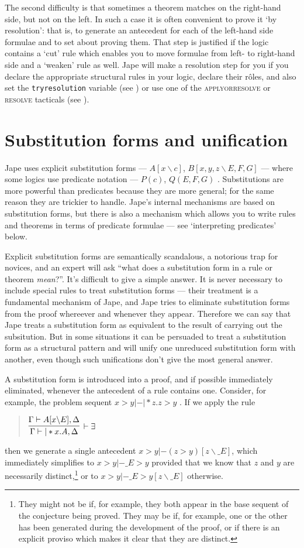 The second difficulty is that sometimes a theorem matches on the right-hand side, but not on the left. In such a case it is often convenient to prove it `by resolution': that is, to generate an antecedent for each of the left-hand side formulae and to set about proving them. That step is justified if the logic contains a `cut' rule which enables you to move formulae from left- to right-hand side and a `weaken' rule as well. Jape will make a resolution step for you if you declare the appropriate structural rules in your logic, declare their r\^{o}les, and also set the \texttt{tryresolution} variable (see ) or use one of the \textsc{applyorresolve} or \textsc{resolve} tacticals (see ).

\section{Substitution forms and unification}

Jape uses explicit substitution forms --- $A[x\backslash c]$, $B[x,y,z\backslash E,F,G]$ --- where some logics use predicate notation --- $P(c)$, $Q(E,F,G)$ . Substitutions are more powerful than predicates because they are more general; for the same reason they are trickier to handle. Jape's internal mechanisms are based on substitution forms, but there is also a mechanism which allows you to write rules and theorems in terms of predicate formulae --- see `interpreting predicates' below.

Explicit substitution forms are semantically scandalous, a notorious trap for novices, and an expert will ask ``what does a substitution form in a rule or theorem \emph{mean}?''. It's difficult to give a simple answer. It is never necessary to include special rules to treat substitution forms --- their treatment is a fundamental mechanism of Jape, and Jape tries to eliminate substitution forms from the proof whereever and whenever they appear. Therefore we can say that Jape treats a substitution form as equivalent to the result of carrying out the subsitution. But in some situations it can be persuaded to treat a substitution form as a structural pattern and will unify one unreduced substitution form with another, even though such unifications don't give the most general answer.

A substitution form is introduced into a proof, and if possible immediately eliminated, whenever the antecedent of a rule contains one. Consider, for example, the problem sequent $x>y |-|*z.z>y$ . If we apply the rule
\begin{quote}
$\infer[|-\exists] {\Gamma|-|*x.A,\Delta} {\Gamma|-A[x\backslash E],\Delta}$
\end{quote}
then we generate a single antecedent $x>y |- (z>y)[z\backslash \_E]$, which immediately simplifies to $x>y |- \_E>y$ provided that we know that $z$ and $y$ are necessarily distinct,\footnote{They might not be if, for example, they both appear in the base sequent of the conjecture being proved. They may be if, for example, one or the other has been generated during the development of the proof, or if there is an explicit proviso which makes it clear that they are distinct.} or to $x>y |- \_E>y[z\backslash \_E]$ otherwise.

